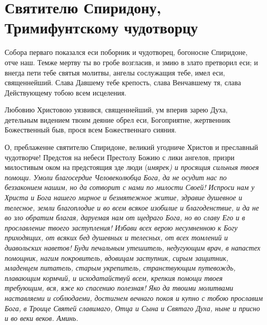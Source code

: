 
 

\section{Святителю Спиридону, Тримифунтскому чудотворцу}
 




Собора перваго показался еси поборник и чудотворец, богоносне Спиридоне, отче наш. Темже мертву ты во гробе возгласив, и змию в злато претворил еси; и внегда пети тебе святыя молитвы, ангелы сослужащия тебе, имел еси, священнейший. Слава Давшему тебе крепость, слава Венчавшему тя, слава Действующему тобою всем исцеления.




Любовию Христовою уязвився, священнейший, ум вперив зарею Духа, детельным видением твоим деяние обрел еси, Богоприятне, жертвенник Божественный быв, прося всем Божественнаго сияния.




О, преблаженне святителю Спиридоне, великий угодниче Христов и преславный чудотворче! Предстоя на небеси Престолу Божию с лики ангелов, призри милостивым оком на предстоящия зде люди (\itshape имярек\normalfont{}) и просящия сильныя твоея помощи. Умоли благосердие Человеколюбца Бога, да не осудит нас по беззаконием нашим, но да сотворит с нами по милости Своей! Испроси нам у Христа и Бога нашего мирное и безмятежное житие, здравие душевное и телесное, земли благоплодие и во всем всякое изобилие и благоденствие, и да не во зло обратим благая, даруемая нам от щедраго Бога, но во славу Его и в прославление твоего заступления! Избави всех верою несумненною к Богу приходящих, от всяких бед душевных и телесных, от всех томлений и диавольских наветов! Буди печальным утешитель, недугующим врач, в напастех помощник, нагим покровитель, вдовицам заступник, сирым защитник, младенцем питатель, старым укрепитель, странствующим путевождь, плавающим кормчий, и исходатайствуй всем, крепкия помощи твоея требующим, вся, яже ко спасению полезная! Яко да твоими молитвами наставляеми и соблюдаеми, достигнем вечнаго покоя и купно с тобою прославим Бога, в Троице Святей славимаго, Отца и Сына и Святаго Духа, ныне и присно и во веки веков. Аминь.


